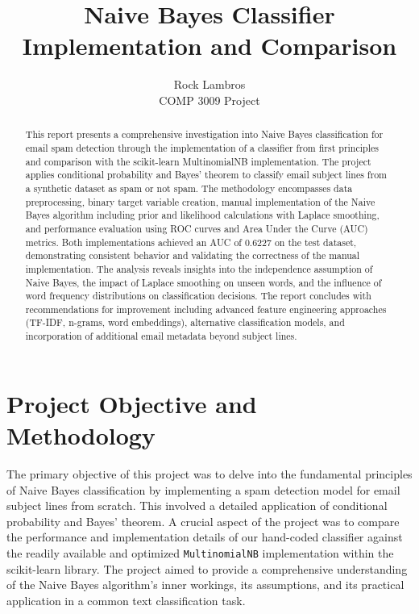 \documentclass[12pt,letterpaper]{article}
\title{Naive Bayes Classifier Implementation and Comparison}
\author{Rock Lambros\\COMP 3009 Project}
\date{}
\begin{document}
\maketitle

\begin{abstract}
This report presents a comprehensive investigation into Naive Bayes classification for email spam detection through the implementation of a classifier from first principles and comparison with the scikit-learn MultinomialNB implementation. The project applies conditional probability and Bayes' theorem to classify email subject lines from a synthetic dataset as spam or not spam. The methodology encompasses data preprocessing, binary target variable creation, manual implementation of the Naive Bayes algorithm including prior and likelihood calculations with Laplace smoothing, and performance evaluation using ROC curves and Area Under the Curve (AUC) metrics. Both implementations achieved an AUC of 0.6227 on the test dataset, demonstrating consistent behavior and validating the correctness of the manual implementation. The analysis reveals insights into the independence assumption of Naive Bayes, the impact of Laplace smoothing on unseen words, and the influence of word frequency distributions on classification decisions. The report concludes with recommendations for improvement including advanced feature engineering approaches (TF-IDF, n-grams, word embeddings), alternative classification models, and incorporation of additional email metadata beyond subject lines.
\end{abstract}

\section{Project Objective and Methodology}

The primary objective of this project was to delve into the fundamental principles of Naive Bayes classification by implementing a spam detection model for email subject lines from scratch. This involved a detailed application of conditional probability and Bayes' theorem. A crucial aspect of the project was to compare the performance and implementation details of our hand-coded classifier against the readily available and optimized \texttt{MultinomialNB} implementation within the scikit-learn library. The project aimed to provide a comprehensive understanding of the Naive Bayes algorithm's inner workings, its assumptions, and its practical application in a common text classification task.
\end{document}
